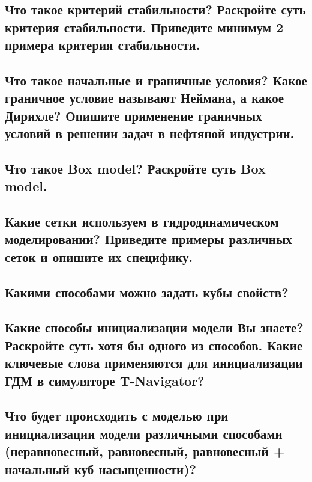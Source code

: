 \documentclass[main.tex]{subfiles}
\begin{document}
\newpage

\subsection{Что такое критерий стабильности? Раскройте суть критерия стабильности. Приведите минимум 2 примера критерия стабильности.}

\newpage

\subsection{Что такое начальные и граничные условия? Какое граничное условие называют Неймана, а какое Дирихле? Опишите применение граничных условий в решении задач в нефтяной индустрии.}

\newpage

\subsection{Что такое Box model? Раскройте суть Box model.}

\newpage

\subsection{Какие сетки используем в гидродинамическом моделировании? Приведите примеры различных сеток и опишите их специфику.}

\newpage

\subsection{Какими способами можно задать кубы свойств?}

\newpage

\subsection{Какие способы инициализации модели Вы знаете? Раскройте суть хотя бы одного из способов. Какие ключевые слова применяются для инициализации ГДМ в симуляторе T-Navigator?}

\newpage

\subsection{Что будет происходить с моделью при инициализации модели различными способами (неравновесный, равновесный, равновесный + начальный куб насыщенности)?}
\end{document}
